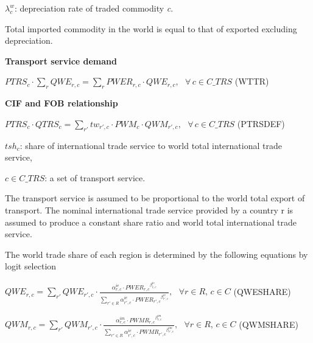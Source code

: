 \documentclass[10pt,a4paper,titlepage,dvipdfmx]{book}
\begin{document}
\begin{flushleft} $\lambda _{c}^{w}$: depreciation rate of traded commodity \textit{c}. \end{flushleft}

Total imported commodity in the world is equal to that of exported excluding depreciation. 

\begin{flushleft}\textbf{Transport service demand}\end{flushleft}


\begin{center}$PTRS_{c}\cdot \sum _{r}QWE_{r,c}=\sum _{r}PWER_{r,c}\cdot QWE_{r,c},\,\,\,\,\forall \,c\in C\_ TRS$ (WTTR)
\end{center}

\begin{flushleft}\textbf{CIF and FOB relationship}\end{flushleft}


\begin{center}$PTRS_{c}\cdot QTRS_{c}=\sum _{r'}tw_{r',c}\cdot PWM_{c}\cdot QWM_{r',c},\,\,\,\,\forall \,c\in C\_ TRS$ (PTRSDEF)
\end{center}

\begin{flushleft}
$tsh_{c}$: share of international trade service to world total international trade service,

$c\in C\_ TRS$: a set of transport service.
\end{flushleft}

The transport service is assumed to be proportional to the world total export of transport. The nominal international trade service provided by a country r is assumed to produce a constant share ratio and world total international trade service.

The world trade share of each region is determined by the following equations by logit selection


\begin{center}$QWE_{r,c}=\sum _{r'}QWE_{r',c}\cdot \frac{\alpha _{r,c}^{ie}\cdot {PWER_{r,c}}^{\beta _{r,c}^{ie}}}{\sum _{r'\in R}\alpha _{r',c}^{ie}\cdot {PWER_{r',c}}^{\beta _{r',c}^{ie}}},\,\,\,\,\forall r\in R,\,c\in C$ (QWESHARE)
\end{center}


\begin{center}$QWM_{r,c}=\sum _{r'}QWM_{r',c}\cdot \frac{\alpha _{r,c}^{im}\cdot {PWMR_{r,c}}^{\beta _{r,c}^{im}}}{\sum _{r'\in R}\alpha _{r',c}^{ie}\cdot {PWMR_{r',c}}^{\beta _{r',c}^{im}}},\,\,\,\,\forall r\in R,\,c\in C$ (QWMSHARE)
\end{center}
\end{document}
